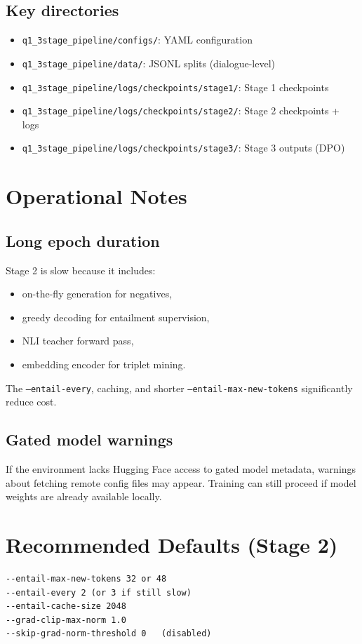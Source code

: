 \documentclass[11pt]{article}
\begin{document}
\subsection{Key directories}
\begin{itemize}
  \item \texttt{q1\_3stage\_pipeline/configs/}: YAML configuration
  \item \texttt{q1\_3stage\_pipeline/data/}: JSONL splits (dialogue-level)
  \item \texttt{q1\_3stage\_pipeline/logs/checkpoints/stage1/}: Stage 1 checkpoints
  \item \texttt{q1\_3stage\_pipeline/logs/checkpoints/stage2/}: Stage 2 checkpoints + logs
  \item \texttt{q1\_3stage\_pipeline/logs/checkpoints/stage3/}: Stage 3 outputs (DPO)
\end{itemize}

\section{Operational Notes}
\subsection{Long epoch duration}
Stage 2 is slow because it includes:
\begin{itemize}
  \item on-the-fly generation for negatives,
  \item greedy decoding for entailment supervision,
  \item NLI teacher forward pass,
  \item embedding encoder for triplet mining.
\end{itemize}
The \texttt{--entail-every}, caching, and shorter \texttt{--entail-max-new-tokens} significantly reduce cost.

\subsection{Gated model warnings}
If the environment lacks Hugging Face access to gated model metadata, warnings about fetching remote config files may appear. Training can still proceed if model weights are already available locally.

\section{Recommended Defaults (Stage 2)}
\begin{lstlisting}
--entail-max-new-tokens 32 or 48
--entail-every 2 (or 3 if still slow)
--entail-cache-size 2048
--grad-clip-max-norm 1.0
--skip-grad-norm-threshold 0   (disabled)
\end{lstlisting}
\end{document}
